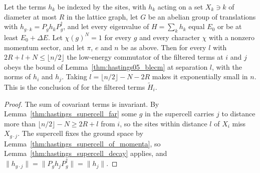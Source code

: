 \begin{lemma}
    \label{thm:hastings_supercell_commutator_small}
    \leanok
    Let the terms $h_k$ be indexed by the sites, with $h_k$ acting on a set
    $X_k\ni k$ of diameter at most $R$ in the lattice graph, let $G$ be an abelian
    group of translations with $h_{g\cdot k}=P_gh_kP_g^\dagger$, and let every
    eigenvalue of $H=\sum_kh_k$ equal $E_0$ or be at least $E_0+\Delta E$. Let
    $\chi(g)^N=1$ for every $g$ and every character $\chi$ with a nonzero
    momentum sector, and let $\pi$, $e$ and $n$ be as above. Then for every $l$
    with $2R+l+N\le\lfloor n/2\rfloor$ the low-energy commutator of the filtered
    terms at $i$ and $j$ obeys the bound of
    Lemma~\ref{thm:hastings05_blecm} at separation $l$, with the norms of $h_i$
    and $h_j$. Taking $l=\lfloor n/2\rfloor-N-2R$ makes it exponentially small in
    $n$. This is the conclusion of \cite[lines 1603--1641]{Hastings2006Solving}
    for the filtered terms $\tilde H_i$.
\end{lemma}
\begin{proof}\leanok
    The sum of covariant terms is invariant. By
    Lemma~\ref{thm:hastings_supercell_far} some $g$ in the supercell carries
    $j$ to distance more than $\lfloor n/2\rfloor-N\ge2R+l$ from $i$, so the
    sites within distance $l$ of $X_i$ miss $X_{g\cdot j}$. The supercell fixes the
    ground space by Lemma~\ref{thm:hastings_supercell_of_momenta}, so
    Lemma~\ref{thm:hastings_supercell_decay} applies, and
    $\|h_{g\cdot j}\|=\|P_gh_jP_g^\dagger\|=\|h_j\|$.
\end{proof}

